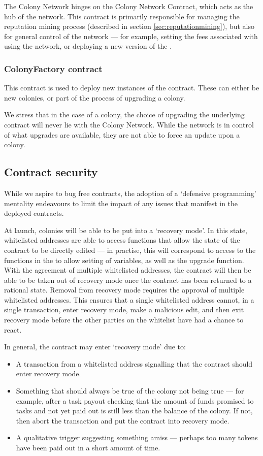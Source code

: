 The Colony Network hinges on the Colony Network Contract, which acts as the hub of the network. This contract is primarily responsible for managing the reputation mining process (described in section \ref{sec:reputationmining}), but also for general control of the network --- for example, setting the fees associated with using the network, or deploying a new version of the .

\subsubsection {ColonyFactory contract}
This contract is used to deploy new instances of the  contract. These can either be new colonies, or part of the process of upgrading a colony.

We stress that in the case of a colony, the choice of upgrading the underlying  contract will never lie with the Colony Network. While the network is in control of what upgrades are available, they are not able to force an update upon a colony.


\subsection{Contract security}\label{sec:escape-hatches}
While we aspire to bug free contracts, the adoption of a `defensive programming' mentality endeavours to limit the impact of any issues that manifest in the deployed contracts.

At launch, colonies will be able to be put into a `recovery mode'. In this state, whitelisted addresses are able to access functions that allow the state of the contract to be directly edited --- in practise, this will correspond to access to the functions in the  to allow setting of variables, as well as the upgrade function. With the agreement of multiple whitelisted addresses, the contract will then be able to be taken out of recovery mode once the contract has been returned to a rational state. Removal from recovery mode requires the approval of multiple whitelisted addresses. This ensures that a single whitelisted address cannot, in a single transaction, enter recovery mode, make a malicious edit, and then exit recovery mode before the other parties on the whitelist have had a chance to react.

In general, the contract may enter `recovery mode' due to:
\begin{itemize}
 \item A transaction from a whitelisted address signalling that the contract should enter recovery mode.
 \item Something that should always be true of the colony not being true --- for example, after a task payout checking that the amount of funds promised to tasks and not yet paid out is still less than the balance of the colony. If not, then abort the transaction and put the contract into recovery mode.
 \item A qualitative trigger suggesting something amiss --- perhaps too many tokens have been paid out in a short amount of time.
\end{itemize}


